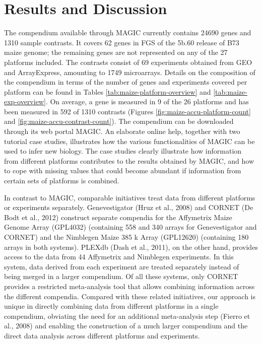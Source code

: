\section{Results and Discussion}

The compendium available through MAGIC currently contains
24690 genes and 1310 sample contrasts. It covers 62%
genes in FGS of the 5b.60 release of B73 maize genome; the
remaining genes are not represented on any of the 27 platforms
included. The contrasts consist of 69 experiments obtained from
GEO and ArrayExpress, amounting to 1749 microarrays. Details
on the composition of the compendium in terms of the number
of genes and experiments covered per platform can be found in
Tables \ref{tab:maize-platform-overview} and 
\ref{tab:maize-exp-overview}. 
On average, a gene is measured in 9 of the 26 platforms and has been measured 
in 592 of 1310 contrasts (Figures \ref{fig:maize-accu-platform-count} and 
\ref{fig:maize-accu-contrast-count}). 
The compendium can be downloaded through its web portal MAGIC. 
An elaborate online help, together with two tutorial case studies,
illustrates how the various functionalities of MAGIC can be
used to infer new biology. 
The case studies clearly illustrate how information from different platforms 
contributes to the results obtained by MAGIC, and how to cope with missing 
values that could become abundant if information from certain sets of
platforms is combined.

In contrast to MAGIC, comparable initiatives treat data from
different platforms or experiments separately. Genevestigator
(Hruz et al., 2008) and CORNET (De Bodt et al., 2012) construct 
separate compendia for the Affymetrix Maize Genome
Array (GPL4032) (containing 558 and 340 arrays for
Genevestigator and CORNET) and the Nimblegen Maize
385 k Array (GPL12620) (containing 180 arrays in both systems).
PLEXdb (Dash et al., 2011), on the other hand, provides access
to the data from 44 Affymetrix and Nimblegen experiments. In
this system, data derived from each experiment are treated separately 
instead of being merged in a larger compendium. Of all
these systems, only CORNET provides a restricted meta-analysis
tool that allows combining information across the different compendia.
Compared with these related initiatives, our approach is
unique in directly combining data from different platforms in a
single compendium, obviating the need for an additional meta-analysis 
step (Fierro et al., 2008) and enabling the construction
of a much larger compendium and the direct data analysis across
different platforms and experiments.



\cleardoublepage


